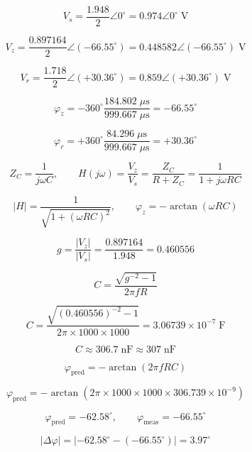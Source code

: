 \documentclass{article}
\begin{document}
\[
V_s=\frac{1.948}{2}\angle 0^\circ=0.974\angle 0^\circ\;\mathrm{V}
\]

\[
V_z=\frac{0.897164}{2}\angle(-66.55^\circ)=0.448582\angle(-66.55^\circ)\;\mathrm{V}
\]

\[
V_r=\frac{1.718}{2}\angle(+30.36^\circ)=0.859\angle(+30.36^\circ)\;\mathrm{V}
\]

\[
\varphi_z=-360^\circ\frac{184.802\;\mu\mathrm{s}}{999.667\;\mu\mathrm{s}}=-66.55^\circ
\]

\[
\varphi_r=+360^\circ\frac{84.296\;\mu\mathrm{s}}{999.667\;\mu\mathrm{s}}=+30.36^\circ
\]

\[
Z_C=\frac{1}{j\omega C},\qquad H(j\omega)=\frac{V_z}{V_s}=\frac{Z_C}{R+Z_C}=\frac{1}{1+j\omega RC}
\]

\[
|H|=\frac{1}{\sqrt{1+(\omega RC)^2}},\qquad\varphi_z=-\arctan(\omega RC)
\]

\[
g=\frac{|V_z|}{|V_s|}=\frac{0.897164}{1.948}=0.460556
\]

\[
C=\frac{\sqrt{g^{-2}-1}}{2\pi fR}
\]

\[
C=\frac{\sqrt{(0.460556)^{-2}-1}}{2\pi\times1000\times1000}=3.06739\times10^{-7}\;\mathrm{F}
\]

\[
C\approx306.7\;\mathrm{nF}\approx307\;\mathrm{nF}
\]

\[
\varphi_{\mathrm{pred}}=-\arctan(2\pi fRC)
\]

\[
\varphi_{\mathrm{pred}}=-\arctan(2\pi\times1000\times1000\times306.739\times10^{-9})
\]

\[
\varphi_{\mathrm{pred}}=-62.58^\circ,\qquad\varphi_{\mathrm{meas}}=-66.55^\circ
\]

\[
|\Delta\varphi|=|-62.58^\circ-(-66.55^\circ)|=3.97^\circ
\]
\end{document}
